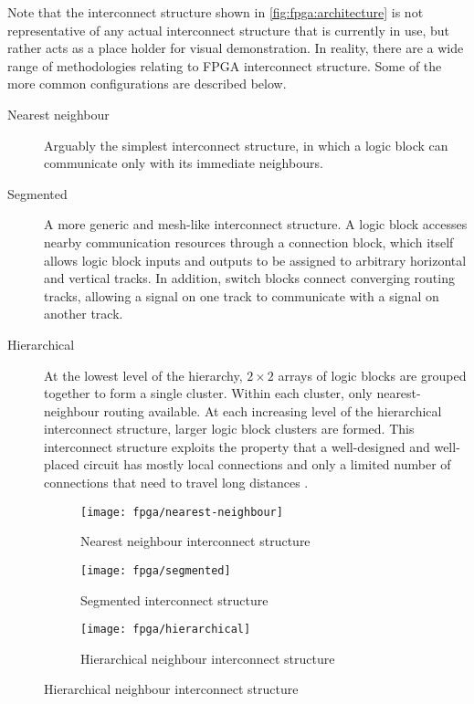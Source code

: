 Note that the interconnect structure shown in \autoref{fig:fpga:architecture} is
not representative of any actual interconnect structure that is currently in
use, but rather acts as a place holder for visual demonstration. In reality,
there are a wide range of methodologies relating to \gls{FPGA} interconnect
structure. Some of the more common configurations are described below.
\begin{description}
    \item[Nearest neighbour] Arguably the simplest interconnect structure, in
        which a logic block can communicate only with its immediate neighbours.
    \item[Segmented] A more generic and mesh-like interconnect structure. A
        logic block accesses nearby communication resources through a connection
        block, which itself allows logic block inputs and outputs to be assigned
        to arbitrary horizontal and vertical tracks. In addition, switch blocks
        connect converging routing tracks, allowing a signal on one track to
        communicate with a signal on another track.
    \item[Hierarchical] At the lowest level of the hierarchy, $2 \times 2$
        arrays of logic blocks are grouped together to form a single cluster.
        Within each cluster, only nearest-neighbour routing available. At each
        increasing level of the hierarchical interconnect structure, larger
        logic block clusters are formed. This interconnect structure exploits
        the property that a well-designed and well-placed circuit has mostly
        local connections and only a limited number of connections that need to
        travel long distances \cite{Hauck:2007}.
\end{description}

\begin{figure}
    \caption{\gls{FPGA} interconnect structures}
    \label{fig:fpga:interconnect}

    \centering
    \begin{subfigure}[b]{0.3\textwidth}
        \centering
        \texttt{[image: fpga/nearest-neighbour]}
        \caption[Nearest neighbour interconnect structure]{Nearest neighbour
            interconnect structure \cite{Hauck:2007}}
        \label{fig:fpga:interconnect:nearestNeighbour}
    \end{subfigure}
    \quad
    \begin{subfigure}[b]{0.3\textwidth}
        \centering
        \texttt{[image: fpga/segmented]}
        \caption[Segmented interconnect structure]{Segmented interconnect
            structure \cite{Hauck:2007}}
        \label{fig:fpga:interconnect:segmented}
    \end{subfigure}
    \quad
    \begin{subfigure}[b]{0.3\textwidth}
        \centering
        \texttt{[image: fpga/hierarchical]}
        \caption[Hierarchical neighbour interconnect structure]{Hierarchical
            neighbour interconnect structure \cite{Hauck:2007}}
        \label{fig:fpga:interconnect:hierarchical}
    \end{subfigure}
\end{figure}

